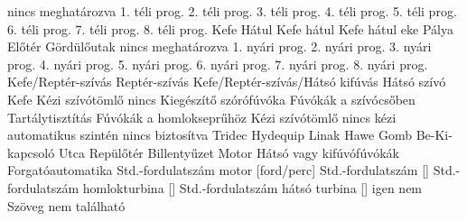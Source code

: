  {nincs meghatározva}
 {1. téli prog.}
 {2. téli prog.}
 {3. téli prog.}
 {4. téli prog.}
 {5. téli prog.}
 {6. téli prog.}
 {7. téli prog.}
 {8. téli prog.}
 {Kefe}
 {Hátul}
 {Kefe hátul}
 {Kefe hátul eke}
 {Pálya}
 {Előtér}
 {Gördülőutak}
 {nincs meghatározva}
 {1. nyári prog.}
 {2. nyári prog.}
 {3. nyári prog.}
 {4. nyári prog.}
 {5. nyári prog.}
 {6. nyári prog.}
 {7. nyári prog.}
 {8. nyári prog.}
 {Kefe/Reptér-szívás}
 {Reptér-szívás}
 {Kefe/Reptér-szívás/Hátsó kifúvás}
 {Hátsó szívó}
 {Kefe}
 {Kézi szívótömlő}
 {nincs}
 {Kiegészítő szórófúvóka}
 {Fúvókák a szívócsőben}
 {Tartálytisztítás}
 {Fúvókák a homlokseprűhöz}
 {Kézi szívótömlő}
 {nincs}
 {kézi}
 {automatikus}
 {szintén nincs biztosítva}
 {Tridec}
 {Hydequip}
 {Linak}
 {Hawe}
 {Gomb}
 {Be-Ki-kapcsoló}
 {Utca}
 {Repülőtér}
 {Billentyűzet}
 {Motor}
 {Hátsó vagy kifúvófúvókák}
 {Forgatóautomatika}
 {Std.-fordulatszám motor [ford/perc]}
 {Std.-fordulatszám [\percent ]}
 {Std.-fordulatszám homlokturbina [\percent ]}
 {Std.-fordulatszám hátsó turbina [\percent ]}
 {igen}
 {nem}
 {Szöveg nem található}

